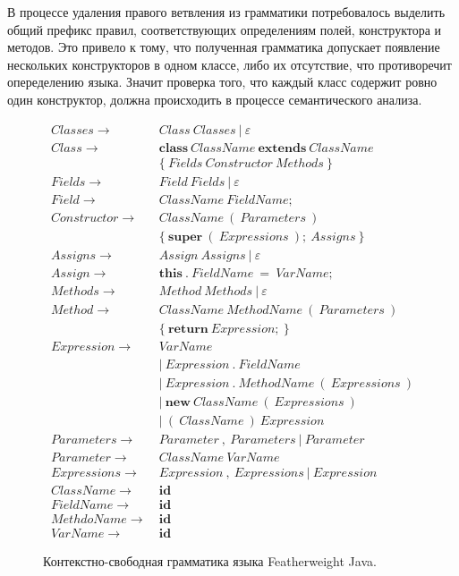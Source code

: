 В процессе удаления правого ветвления из грамматики потребовалось выделить общий префикс правил,
соответствующих определениям полей, конструктора и методов.
Это привело к тому, что полученная грамматика допускает появление нескольких конструкторов в одном классе, либо их отсутствие,
что противоречит опеределению языка.
Значит проверка того, что каждый класс содержит ровно один конструктор, должна происходить в процессе семантического анализа.
\begin{figure}
    \begin{align*}
        Classes \rightarrow&\ Class\ Classes\ |\ \varepsilon\\
        Class \rightarrow&\ \pmb{class}\ ClassName\ \pmb{extends}\ ClassName\\
        &\ \{\ Fields\ Constructor\ Methods\ \}\\
        Fields \rightarrow&\ Field\ Fields\ |\ \varepsilon\\
        Field \rightarrow&\ ClassName\ FieldName;\\
        Constructor \rightarrow& \ ClassName\ (\ Parameters\ )\\
        &\ \{\ \pmb{super}\ (\ Expressions\ );\ Assigns\ \}\\
        Assigns \rightarrow&\ Assign\ Assigns\ |\ \varepsilon\\
        Assign \rightarrow&\ \pmb{this}\ .\ FieldName\ =\ VarName;\\
        Methods \rightarrow&\ Method\ Methods\ |\ \varepsilon\\
        Method \rightarrow&\ ClassName\ MethodName\ (\ Parameters\ )\\
        &\ \{\ \pmb{return}\ Expression;\ \}\\
        Expression \rightarrow&\ VarName\\
        &\ |\ Expression\ .\ FieldName\\
        &\ |\ Expression\ .\ MethodName\ (\ Expressions\ )\\
        &\ |\ \pmb{new}\ ClassName\ (\ Expressions\ )\\
        &\ |\ (\ ClassName\ )\ Expression\\
        Parameters \rightarrow&\ Parameter\ ,\ Parameters\ |\ Parameter\\
        Parameter \rightarrow&\ ClassName\ VarName\\
        Expressions \rightarrow&\ Expression\ ,\ Expressions\ |\ Expression\\
        ClassName \rightarrow&\ \pmb{id}\\
        FieldName \rightarrow&\ \pmb{id}\\
        MethdoName \rightarrow&\ \pmb{id}\\
        VarName \rightarrow&\ \pmb{id}
    \end{align*}
    \caption{Контекстно-свободная грамматика языка Featherweight Java.}
    \label{cf-fj}
\end{figure}

